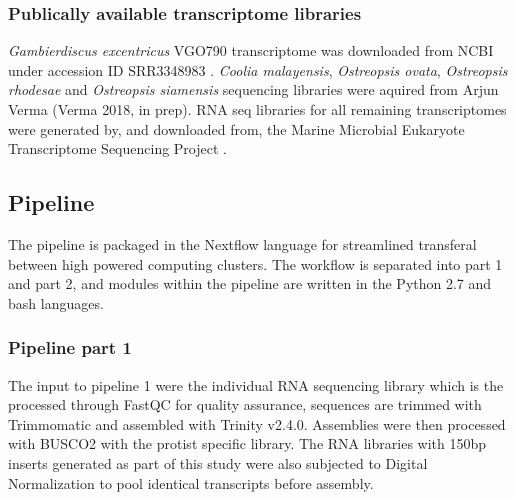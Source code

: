\documentclass[12pt]{article}
\begin{document}
\subsubsection*{Publically available transcriptome libraries}
\emph{Gambierdiscus excentricus} VGO790 transcriptome was downloaded from NCBI under accession ID SRR3348983 \cite{kohli2017role}. 
\textit{Coolia malayensis}, \textit{Ostreopsis ovata}, \textit{Ostreopsis rhodesae} and \textit{Ostreopsis siamensis} sequencing libraries were aquired from Arjun Verma (Verma 2018, in prep). 
RNA seq libraries for all remaining transcriptomes were generated by, and downloaded from, the Marine Microbial Eukaryote Transcriptome Sequencing Project \citep{keeling2014marine}.

\subsection*{Pipeline}
The pipeline is packaged in the Nextflow language for streamlined transferal between high powered computing clusters. 
The workflow is separated into part 1 and part 2, and modules within the pipeline are written in the Python 2.7 and bash languages. \cite{eddy2015hmmer}
\subsubsection*{Pipeline part 1}
The input to pipeline 1 were the individual RNA sequencing library which is the processed through FastQC for quality assurance, sequences are trimmed with Trimmomatic and assembled with Trinity v2.4.0. 
Assemblies were then processed with BUSCO2 with the protist specific library.
The RNA libraries with 150bp inserts generated as part of this study were also subjected to Digital Normalization to pool identical transcripts before assembly.                                                                                                                                                                                                                                                                                                                                                                                                                                                                                                                                                                                                                                                                                                                                                                                                                                                                                                                                                                                                                                                                                                                                                                                                                                                                                                                                           
\end{document}
